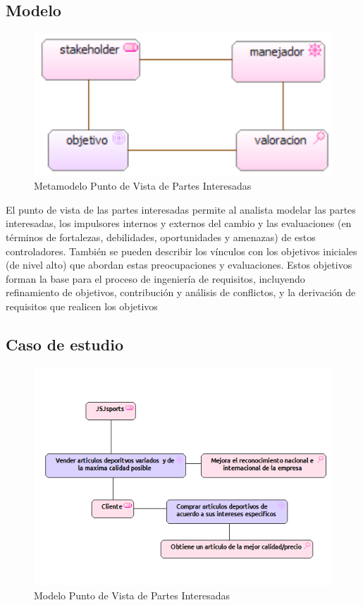 \subsection{Modelo}
\begin{figure}[th!]
	\centering
	\includegraphics[width=0.7\linewidth]{arquitectura/imagenes/modeloStakeholder}
	\caption{Metamodelo Punto de Vista de Partes Interesadas}
	\label{metamodelo partes interesadas}
\end{figure}
El punto de vista de las partes interesadas permite al analista modelar las partes interesadas, los impulsores internos y externos del cambio y las evaluaciones (en términos de fortalezas, debilidades, oportunidades y amenazas) de estos controladores. También se pueden describir los vínculos con los objetivos iniciales (de nivel alto) que abordan estas preocupaciones y evaluaciones. Estos objetivos forman la base para el proceso de ingeniería de requisitos, incluyendo refinamiento de objetivos, contribución y análisis de conflictos, y la derivación de requisitos que realicen los objetivos


\subsection{Caso  de estudio}

\begin{figure}[th!]
	\centering
	\includegraphics[width=0.6\linewidth]{arquitectura/imagenes/PuntoVistaStakeholder}
	\caption{Modelo Punto de Vista de Partes Interesadas}
	\label{modelopartesinteresadas}
\end{figure}

